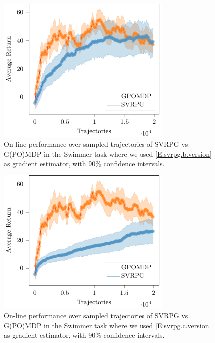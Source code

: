 \begin{figure}[h]
	\begin{minipage}[h]{1\textwidth}
		\centering
		\includegraphics[width=0.75\textwidth]{Images/Experiments/swimmer_SVRPG_vs_GPOMDP_B.pdf}
		\vspace{-0.1in}
		\caption{On-line performance over sampled trajectories of \acs{SVRPG} vs G(PO)MDP in the Swimmer task where we used \ref{E:svrpg.b.version} as gradient estimator, with 90\% confidence intervals.}
		\label{fig:swimmerfive}
	\end{minipage}
	\vspace{-0.15in}
\end{figure}

\begin{figure}[h]
	\begin{minipage}[h]{1\textwidth}
		\centering
		\includegraphics[width=0.75\textwidth]{Images/Experiments/swimmer_SVRPG_vs_GPOMDP_C.pdf}
		\vspace{-0.1in}
		\caption{On-line performance over sampled trajectories of \acs{SVRPG} vs G(PO)MDP in the Swimmer task where we used \ref{E:svrpg.c.version} as gradient estimator, with 90\% confidence intervals.}
		\label{fig:swimmerfour}
	\end{minipage}
	\vspace{-0.15in}
\end{figure}


